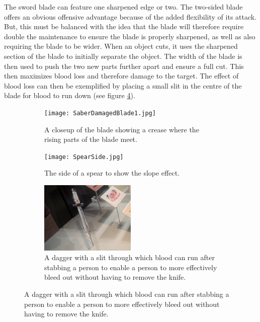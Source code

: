 \documentclass{article}
\begin{document}
The sword blade can feature one sharpened edge or two. The two-sided blade offers an obvious offensive advantage because of the added flexibility of its attack. But, this must be balanced with the idea that the blade will therefore require double the maintenance to ensure the blade is properly sharpened, as well as also requiring the blade to be wider. When an object cuts, it uses the sharpened section of the blade to initially separate the object. The width of the blade is then used to push the two new parts further apart and ensure a full cut. This then maximizes blood loss and therefore damage to the target. The effect of blood loss can then be exemplified by placing a small slit in the centre of the blade for blood to run down (see figure \ref{fig:swordSlit}). 

\begin{figure}[h]
    \centering
    \caption{}
    \begin{subfigure}{0.49\textwidth}
        \texttt{[image: SaberDamagedBlade1.jpg]}
        \caption{A closeup of the blade showing a crease where the rising parts of the blade meet.}
        \label{fig:SwordCrease}
    \end{subfigure}
    \begin{subfigure}{0.49\textwidth}
        \texttt{[image: SpearSide.jpg]}
        \caption{The side of a spear to show the slope effect.}
        \label{fig:SpearSide}
    \end{subfigure}
    \begin{subfigure}{\textwidth}
        \centering
        \includegraphics[width=0.5\textwidth]{Dagger2.jpg}
        \caption{A dagger with a slit through which blood can run after stabbing a person to enable a person to more effectively bleed out without having to remove the knife.}
        \label{fig:swordSlit}
    \end{subfigure}
\end{figure}
\end{document}
